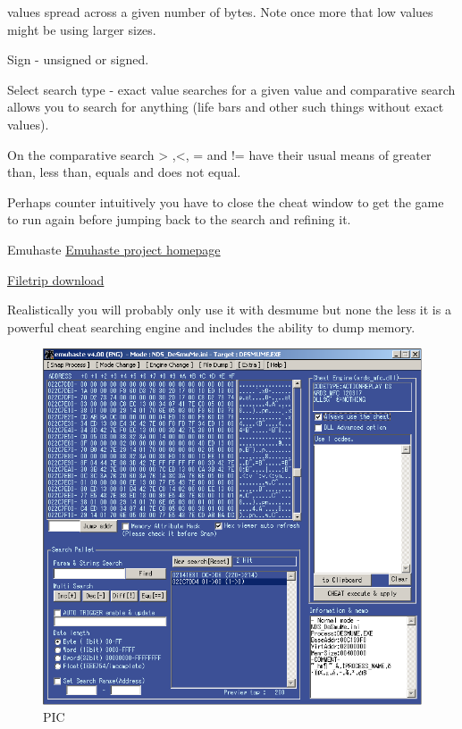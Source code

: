 \documentclass[
]{book}
\begin{document}
values spread across a given number of bytes. Note once more that low values might be using larger sizes.

Sign - unsigned or signed.

Select search type - exact value searches for a given value and comparative search allows you to search for anything (life bars and other such things without exact values).

On the comparative search \textgreater{} ,\textless, = and != have their usual means of greater than, less than, equals and does not equal.

Perhaps counter intuitively you have to close the cheat window to get the game to run again before jumping back to the search and refining it.

Emuhaste \href{http://i486.client.jp/emuhaste/}{Emuhaste project homepage}

\href{http://filetrip.net/nds-downloads/utilities/latest-emucr-emuhaste-f29424.html}{Filetrip download}

Realistically you will probably only use it with desmume but none the less it is a powerful cheat searching engine and includes the ability to dump memory.

\begin{figure}
\centering
\includegraphics{images/199_home_fast6191_romhackingguide_unrenamed_fil___original_borders_romhackingguidendsemuhaste.png}
\caption{PIC}
\end{figure}
\end{document}
